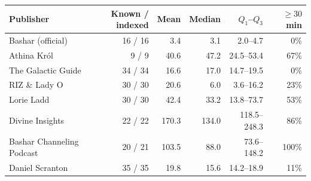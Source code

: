 \begin{tabular}{@{}lrrrrr@{}}
\toprule
Publisher & Known / indexed & Mean & Median & $Q_1$--$Q_3$ & $\geq30$ min \\
\midrule
Bashar (official) & 16 / 16 & 3.4 & 3.1 & 2.0--4.7 & 0\% \\
Athina Król & 9 / 9 & 40.6 & 47.2 & 24.5--53.4 & 67\% \\
The Galactic Guide & 34 / 34 & 16.6 & 17.0 & 14.7--19.5 & 0\% \\
RIZ \& Lady O & 30 / 30 & 20.6 & 6.0 & 3.6--16.2 & 23\% \\
Lorie Ladd & 30 / 30 & 42.4 & 33.2 & 13.8--73.7 & 53\% \\
Divine Insights & 22 / 22 & 170.3 & 134.0 & 118.5--248.3 & 86\% \\
Bashar Channeling Podcast & 20 / 21 & 103.5 & 88.0 & 73.6--148.2 & 100\% \\
Daniel Scranton & 35 / 35 & 19.8 & 15.6 & 14.2--18.9 & 11\% \\
\bottomrule
\end{tabular}
